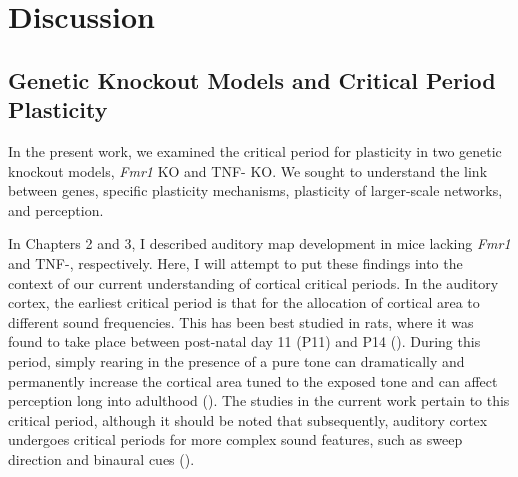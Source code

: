\chapter{Discussion}

\section{Genetic Knockout Models and Critical Period Plasticity}

In the present work, we examined the critical period for plasticity in two genetic knockout models, \textit{Fmr1} KO and TNF-\textalpha{} KO. We sought to understand the link between genes, specific plasticity mechanisms, plasticity of larger-scale networks, and perception.

In Chapters 2 and 3, I described auditory map development in mice lacking \textit{Fmr1} and TNF-\textalpha{}, respectively. Here, I will attempt to put these findings into the context of our current understanding of cortical critical periods. In the auditory cortex, the earliest critical period is that for the allocation of cortical area to different sound frequencies. This has been best studied in rats, where it was found to take place between post-natal day 11 (P11) and P14 (\cite{DeVillers-Sidani2008}). During this period, simply rearing in the presence of a pure tone can dramatically and permanently increase the cortical area tuned to the exposed tone and can affect perception long into adulthood (\cite{Han2007}). The studies in the current work pertain to this critical period, although it should be noted that subsequently, auditory cortex undergoes critical periods for more complex sound features, such as sweep direction and binaural cues (\cite{Insanally2009, Popescu2010a}).


